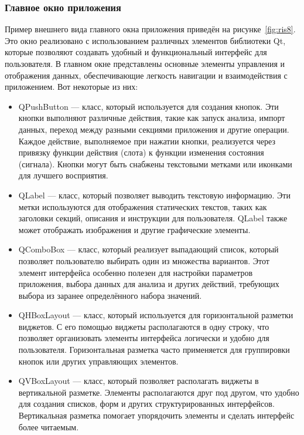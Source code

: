 \subsubsection{Главное окно приложения}

Пример внешнего вида главного окна приложения приведён на рисунке~\ref{fig:ris8}. Это окно реализовано с использованием различных элементов библиотеки Qt, которые позволяют создавать удобный и функциональный интерфейс для пользователя. В главном окне представлены основные элементы управления и отображения данных, обеспечивающие легкость навигации и взаимодействия с приложением. Вот некоторые из них:

\begin{itemize}
	\item QPushButton --- класс, который используется для создания кнопок. Эти кнопки выполняют различные действия, такие как запуск анализа, импорт данных, переход между разными секциями приложения и другие операции. Каждое действие, выполняемое при нажатии кнопки, реализуется через привязку функции действия (слота) к функции изменения состояния (сигнала). Кнопки могут быть снабжены текстовыми метками или иконками для лучшего восприятия.
	\item QLabel --- класс, который позволяет выводить текстовую информацию. Эти метки используются для отображения статических текстов, таких как заголовки секций, описания и инструкции для пользователя. QLabel также может отображать изображения и другие графические элементы.
	\item QComboBox --- класс, который реализует выпадающий список, который позволяет пользователю выбирать один из множества вариантов. Этот элемент интерфейса особенно полезен для настройки параметров приложения, выбора данных для анализа и других действий, требующих выбора из заранее определённого набора значений.
	\item QHBoxLayout --- класс, который используется для горизонтальной разметки виджетов. С его помощью виджеты располагаются в одну строку, что позволяет организовать элементы интерфейса логически и удобно для пользователя. Горизонтальная разметка часто применяется для группировки кнопок или других управляющих элементов.
	
	\item QVBoxLayout --- класс, который позволяет располагать виджеты в вертикальной разметке. Элементы располагаются друг под другом, что удобно для создания списков, форм и других структурированных интерфейсов. Вертикальная разметка помогает упорядочить элементы и сделать интерфейс более читаемым.
\end{itemize}

